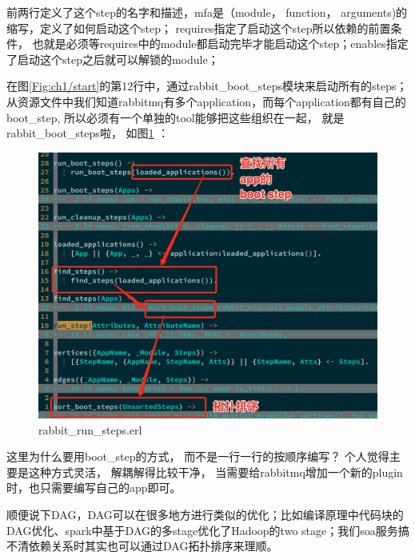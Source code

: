 前两行定义了这个step的名字和描述，mfa是（module， function， arguments)的缩写，定义了如何启动这个step； requires指定了启动这个step所以依赖的前置条件， 也就是必须等requires中的module都启动完毕才能启动这个step；enables指定了启动这个step之后就可以解锁的module；

在图\ref{Fig:ch1/start}的第12行中，通过rabbit\_boot\_steps模块来启动所有的steps；从资源文件中我们知道rabbitmq有多个application，而每个application都有自己的boot\_step, 所以必须有一个单独的tool能够把这些组织在一起， 就是rabbit\_boot\_steps啦， 如图\ref{Fig:ch1/run_step} ：
\begin{figure}[h]
	\vspace{0mm}
	\includegraphics[width=\textwidth]{img/ch1/run_step.jpeg}
	\caption{\label{Fig:ch1/run_step}rabbit\_run\_steps.erl}
\end{figure}

这里为什么要用boot\_step的方式， 而不是一行一行的按顺序编写？ 个人觉得主要是这种方式灵活， 解耦解得比较干净， 当需要给rabbitmq增加一个新的plugin时，也只需要编写自己的app即可。

顺便说下DAG，DAG可以在很多地方进行类似的优化；比如编译原理中代码块的DAG优化、spark中基于DAG的多stage优化了Hadoop的two stage；我们soa服务搞不清依赖关系时其实也可以通过DAG拓扑排序来理顺。






